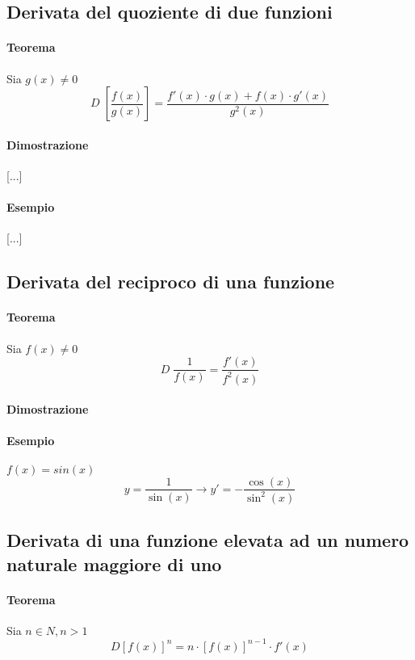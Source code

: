 \documentclass[a4paper,14pt]{extarticle}
\begin{document}
\subsection{Derivata del quoziente di due funzioni} 
\paragraph{Teorema \\} Sia $g(x) \ne 0$
\large
\[ D\;\left[ \frac{f(x)}{g(x)} \right]= \frac{f'(x)  \cdot g(x) + f(x) \cdot g'(x)}{g^2(x)} \] \normalsize
\paragraph{Dimostrazione \\}
[...]
\paragraph{Esempio \\}
[...]

\subsection{Derivata del reciproco di una funzione}
\paragraph{Teorema \\} Sia $f(x) \ne 0$ \large \[ D\;\frac{1}{f(x)} = \frac{f'(x)}{f^2(x)} \] \normalsize
\paragraph{Dimostrazione \\}
\paragraph{Esempio \\} $f(x)=sin(x)$ \large \[ y=\frac{1}{\sin(x)} \xrightarrow{} y'=-\frac{\cos(x)}{\sin^2(x)}\] \normalsize

\subsection{Derivata di una funzione elevata ad un numero naturale maggiore di uno}
\paragraph{Teorema \\} Sia $n \in N, n > 1$\large \[ D[f(x)]^n=n \cdot [f(x)]^{n-1} \cdot f'(x)\] \normalsize
\end{document}
